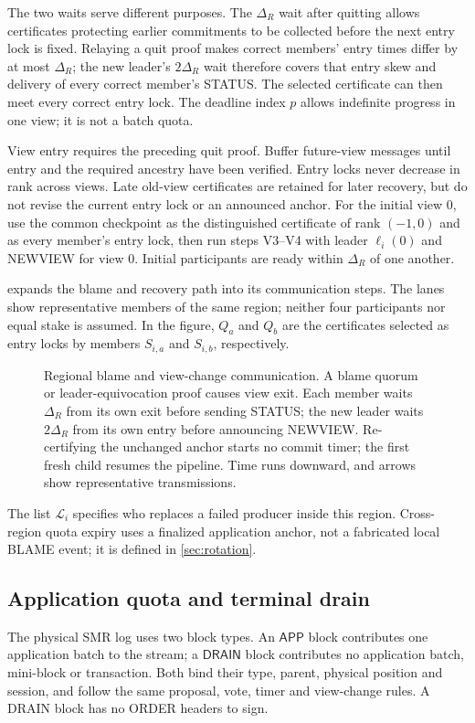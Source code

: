 \documentclass[11pt,a4paper,onecolumn]{article}
\newcommand{\Tag}[1]{\ensuremath{\mathsf{#1}}}
\begin{document}
The two waits serve different purposes. The $\Delta_R$ wait after quitting
allows certificates protecting earlier commitments to be collected before
the next entry lock is fixed. Relaying a quit proof makes correct members'
entry times differ by at
most $\Delta_R$; the new leader's $2\Delta_R$ wait therefore covers that
entry skew and delivery of every correct member's STATUS. The selected
certificate can then meet every correct entry lock. The deadline index $p$
allows indefinite progress in one view; it is not a batch quota.

View entry requires the preceding quit proof. Buffer future-view messages
until entry and the required ancestry have been verified. Entry locks never
decrease in rank across views. Late old-view certificates are retained for
later recovery, but do not revise the current entry lock or an announced anchor.
For the initial view $0$, use the common checkpoint as the distinguished
certificate of rank $(-1,0)$ and as every member's entry lock, then run
steps V3--V4 with leader $\ell_i(0)$ and NEWVIEW for view $0$.
Initial participants are ready within $\Delta_R$ of one another.

 expands the blame and recovery path into its communication
steps. The lanes show representative members of the same region; neither
four participants nor equal stake is assumed. In the figure, $Q_a$ and
$Q_b$ are the certificates selected as entry locks by members $S_{i,a}$
and $S_{i,b}$, respectively.

\begin{figure}[p]\centering
\resizebox{\linewidth}{!}{}
\caption{Regional blame and view-change communication. A blame quorum or
leader-equivocation proof causes view exit. Each member waits $\Delta_R$
from its own exit before sending STATUS; the new leader waits $2\Delta_R$
from its own entry before announcing NEWVIEW. Re-certifying the unchanged
anchor starts no commit timer; the first fresh child resumes the pipeline.
Time runs downward, and arrows show representative transmissions.}
\label{fig:change}
\end{figure}

The list $\mathcal L_i$ specifies who replaces a failed producer inside
this region. Cross-region quota expiry uses a finalized application anchor,
not a fabricated local BLAME event; it is defined in \cref{sec:rotation}.

\subsection{Application quota and terminal drain}\label{sec:drain}
The physical SMR log uses two block types. An \Tag{APP} block contributes
one application batch to the stream; a \Tag{DRAIN} block contributes no
application batch, mini-block or transaction. Both bind their type, parent,
physical position and session, and follow the same proposal, vote, timer
and view-change rules. A DRAIN block has no ORDER headers to sign.
\end{document}
